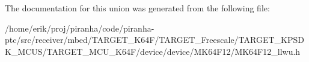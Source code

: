 The documentation for this union was generated from the following file\+:\begin{DoxyCompactItemize}
\item 
/home/erik/proj/piranha/code/piranha-\/ptc/src/receiver/mbed/\+T\+A\+R\+G\+E\+T\+\_\+\+K64\+F/\+T\+A\+R\+G\+E\+T\+\_\+\+Freescale/\+T\+A\+R\+G\+E\+T\+\_\+\+K\+P\+S\+D\+K\+\_\+\+M\+C\+U\+S/\+T\+A\+R\+G\+E\+T\+\_\+\+M\+C\+U\+\_\+\+K64\+F/device/device/\+M\+K64\+F12/M\+K64\+F12\+\_\+llwu.\+h\end{DoxyCompactItemize}
